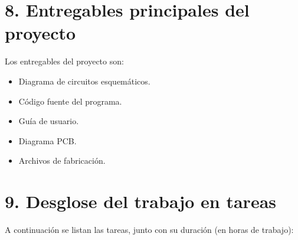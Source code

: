\documentclass[
11pt, %
codirector, %
]{charter}
\begin{document}
\section{8. Entregables principales del proyecto}
\label{sec:entregables}


Los entregables del proyecto son:

\begin{itemize}
	\item Diagrama de circuitos esquemáticos.
	\item Código fuente del programa.
	\item Guía de usuario.
	\item Diagrama PCB.
	\item Archivos de fabricación.
\end{itemize}


\section{9. Desglose del trabajo en tareas}
\label{sec:wbs}

A continuación se listan las tareas, junto con su duración  (en horas de trabajo):
\end{document}
